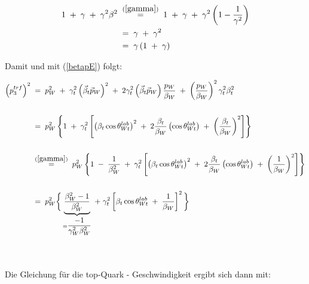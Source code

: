 \documentclass[
a4paper,                                %
twoside,                                %
BCOR1.4cm,                      %
ngerman,                                %
10pt,                           %
headings=normal,                %
headsepline,                    %
clearplainpage, %
final,                                  %
div=14,
parskip=full
]{scrbook}
\begin{document}
\begin{align}
	1\;+\;\gamma\;+\;\gamma^{2} \beta^{2}
\;&\stackrel{\mathrm{(\ref{gamma})}}=\;
	1\;+\;\gamma\;+\;\gamma^{2} \left(1 - \dfrac{1}{\gamma^{2}} \right)
\nonumber
\\
\;&=\;
	\gamma\;+\;\gamma^{2}
\nonumber
\\
\;&=\;
	\gamma \left(1\;+\;\gamma \right)
\nonumber
\end{align}

Damit und mit (\ref{betapE}) folgt:

\begin{align}
	\left(p_{3}^{trf} \right)^{2}
\;&=\;
	p_{W}^{2}\;+\;
	\gamma_{t}^{2} \left(\vec{\beta}_{t} \vec{p}_{W}\right)^{2}
	\;+\;2 \gamma_{t}^{2} \left(\vec{\beta}_{t} \vec{p}_{W}\right) 
	\dfrac{p_{W}}{\beta_{W}}
	\;+\; \left(\dfrac{p_{W}}{\beta_{W}}\right)^{2} \gamma_{t}^{2} \beta_{t}^{2}
\nonumber
\\
\nonumber
\\
\;&=\;
	p_{W}^{2} \left\{1\;+\;
		\gamma_{t}^{2} \left[
			\left(\beta_{t} \cos \theta_{Wt}^{lab} \right)^{2}
			\;+\;2 \dfrac{\beta_{t}}{\beta_{W}} 
			\left(\cos \theta_{Wt}^{lab} \right) 
			\;+\; \left(\dfrac{\beta_{t}}{\beta_{W}}\right)^{2} 
		\right]
	\right\}
\nonumber
\\
\nonumber
\\
\;&\stackrel{\mathrm{(\ref{gamma})}}=\;
	p_{W}^{2} \left\{1\;-\;\dfrac{1}{\beta_{W}^{2}}\;+\;
		\gamma_{t}^{2} \left[
			\left(\beta_{t} \cos \theta_{Wt}^{lab} \right)^{2}
			\;+\;2 \dfrac{\beta_{t}}{\beta_{W}} 
			\left(\cos \theta_{Wt}^{lab} \right) 
			\;+\; \left(\dfrac{1}{\beta_{W}}\right)^{2} 
		\right]
	\right\}
\nonumber
\\
\nonumber
\\
\;&=\;
	p_{W}^{2} \bigg\{
		\underbrace{\frac{\beta_{W}^{2} - 1}{\beta_{W}^{2}}}
		_{ = \dfrac{-1}{\gamma_{W}^{2} \beta_{W}^{2}}}
		\;+\;\gamma_{t}^{2} \left[
			\beta_{t} \cos \theta_{Wt}^{lab}
			\;+\;\dfrac{1}{\beta_{W}} 
		\right]^{2}
	\bigg\}
\\
\nonumber
\\
\nonumber
\end{align}

Die Gleichung f\"ur die top-Quark - Geschwindigkeit ergibt sich dann mit:
\end{document}
